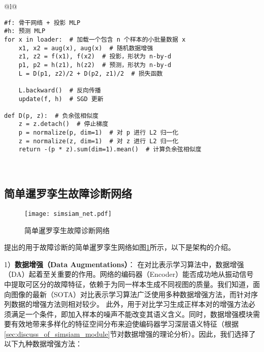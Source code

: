 \documentclass[master]{thesis-uestc}
\begin{document}
\begin{table}
    \caption{简单暹罗孪生网络的伪代码，用Pytorch描述}
    \begin{tabular}{@{}l@{}} %
    \toprule
     \\ %
    \midrule
    \begin{lstlisting}[basicstyle=\ttfamily,frame=none]
#f: 骨干网络 + 投影 MLP
#h: 预测 MLP
for x in loader:  # 加载一个包含 n 个样本的小批量数据 x
    x1, x2 = aug(x), aug(x)  # 随机数据增强
    z1, z2 = f(x1), f(x2)  # 投影，形状为 n-by-d
    p1, p2 = h(z1), h(z2)  # 预测，形状为 n-by-d
    L = D(p1, z2)/2 + D(p2, z1)/2  # 损失函数

    L.backward()  # 反向传播
    update(f, h)  # SGD 更新

def D(p, z):  # 负余弦相似度
    z = z.detach()  # 停止梯度
    p = normalize(p, dim=1)  # 对 p 进行 L2 归一化
    z = normalize(z, dim=1)  # 对 z 进行 L2 归一化
    return -(p * z).sum(dim=1).mean()  # 计算负余弦相似度
    \end{lstlisting} \\
    \bottomrule
    \end{tabular}
    \label{table:simsiam_code}
\end{table}
\subsection{简单暹罗孪生故障诊断网络}
\begin{figure}[h]
    \centering
    \texttt{[image: simsiam\_net.pdf]}
    \caption{简单暹罗孪生故障诊断网络}
    \label{simsiam_net}
\end{figure}
提出的用于故障诊断的简单暹罗孪生网络如图\ref{simsiam_net}所示，以下是架构的介绍。

1）\textbf{数据增强（Data Augmentations）}：
在对比表示学习算法中，数据增强（DA）起着至关重要的作用。网络的编码器（Encoder）能否成功地从振动信号中提取可区分的故障特征，依赖于为同一样本生成不同视图的质量。我们知道，面向图像的最新（SOTA）对比表示学习算法广泛使用多种数据增强方法，而针对序列数据的增强方法则相对较少。
此外，用于对比学习生成正样本对的增强方法必须满足一个条件，即加入样本的噪声不能改变其语义含义。同时，数据增强模块需要有效地带来多样化的特征空间分布来迫使编码器学习深层语义特征（根据\ref{sec:discuss_of_simsiam_module}节对数据增强的理论分析）。因此，我们选择了以下九种数据增强方法：
\end{document}
